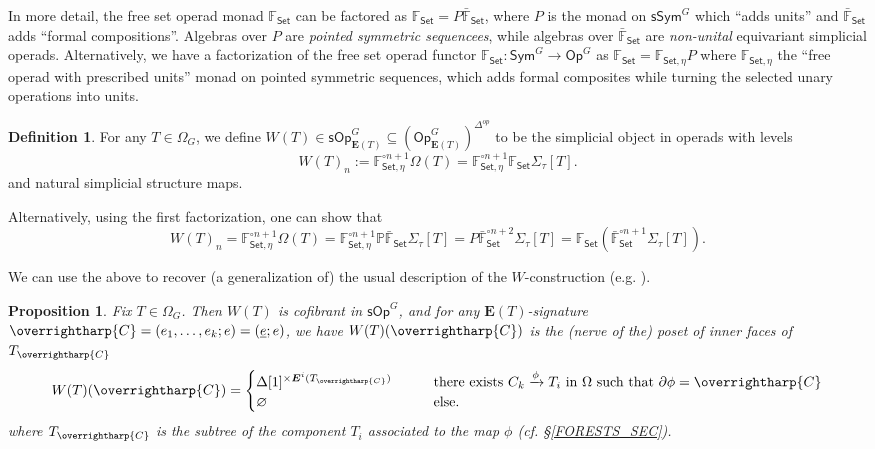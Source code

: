 \documentclass[a4paper,10pt
,draft
]{article}%
\numberwithin{equation}{section}
\numberwithin{figure}{section}
\newtheorem{proposition}[equation]{Proposition}%
\theoremstyle{definition} %
\newtheorem{definition}[equation]{Definition}%
\newcommand{\vect}[1]{\text{\overrightharp{\ensuremath{#1}}}}
\newcommand{\Set}{\ensuremath{\mathsf{Set}}}
\newcommand{\Op}{\mathsf{Op}}%
\newcommand{\sOp}{\ensuremath{\mathsf{sOp}}}%
\newcommand{\1}{\ensuremath{\mathbbm 1}}%
\begin{document}
In more detail, the free set operad monad $\mathbb F_\Set$ can be factored as
$\mathbb F_\Set = P \bar{\mathbb F}_\Set$,
where $P$ is the monad on $\mathsf{sSym}^G$ which ``adds units''
and $\bar{\mathbb F}_\Set$ adds ``formal compositions''.
Algebras over $P$ are \textit{pointed symmetric sequencees}, while algebras over $\bar{\mathbb F}_\Set$ are \textit{non-unital} equivariant simplicial operads.
Alternatively, we have a factorization of the free set operad functor $\mathbb F_\Set \colon \mathsf{Sym}^G \to \Op^G$ as
$\mathbb F_\Set = \mathbb F_{\Set,\eta} P$
where $\mathbb F_{\Set,\eta}$ the ``free operad with prescribed units'' monad on pointed symmetric sequences,
which adds formal composites while turning the selected unary operations into units.
\begin{definition}
      For any $T \in \Omega_G$, we define $W(T) \in \sOp_{\boldsymbol{E}(T)}^G \subseteq (\Op_{\boldsymbol{E}(T)}^G)^{\Delta^{op}}$
      to be the simplicial object in operads with levels
      \[
            W(T)_n := \mathbb F_{\Set,\eta}^{\circ n+1}\Omega(T)= \mathbb F_{\Set,\eta}^{\circ n+1}\mathbb F_\Set \Sigma_\tau[T].
      \]
      and natural simplicial structure maps.
\end{definition}
Alternatively, using the first factorization, one can show that
\begin{equation}
      \label{WT_EQ}
      W(T)_n = \mathbb F_{\Set,\eta}^{\circ n+1} \Omega(T)
      = \mathbb F_{\Set,\eta}^{\circ n+1} \mathbb P \bar{\mathbb F}_\Set \Sigma_\tau[T]
      = P \bar{\mathbb F}_\Set^{\circ n+2}\Sigma_\tau[T]
      = \mathbb F_\Set \left( \bar{\mathbb F}_\Set^{\circ n+1} \Sigma_\tau[T] \right).
\end{equation}

We can use the above to recover (a generalization of) the usual description of the $W$-construction (e.g. \cite[\S 4]{CM13b}).
\begin{proposition}
      \label{WT_PROP}
      Fix $T \in \Omega_G$.
      Then $W(T)$ is cofibrant in $\sOp^G$,
      and for any $\boldsymbol{E}(T)$-signature $\vect C = (e_1, \dots, e_k; e) = (\underline{e}; e)$, we have
      $W(T)(\vect C)$ is the (nerve of the) poset of inner faces of $T_{\vect C}$
      \[
            W(T)(\vect C) =
            \begin{cases}
                  \Delta[1]^{\times \boldsymbol{E}^i(T_{\vect C})} \qquad
                  & \mbox{there exists $C_k \xrightarrow{\phi} T_i$ in $\Omega$ such that $\partial\phi=\vect C$}
                  \\
                  \varnothing & \mbox{else.}
            \end{cases}
      \]
      where $T_{\vect C}$ is the subtree of the component $T_i$ associated to the map $\phi$ (cf. \S \ref{FORESTS_SEC}).
\end{proposition}
\end{document}
